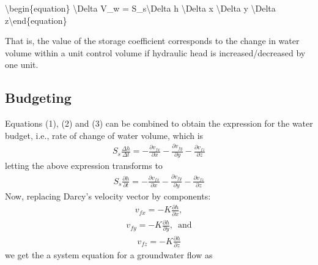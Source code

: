 \documentclass[letterpaper,10pt,english]{jupyterBook}
\begin{document}
\sphinxAtStartPar
\textbackslash{}begin\{equation\}
\textbackslash{}Delta V\_w = S\_s\textbackslash{}Delta h \textbackslash{}Delta x \textbackslash{}Delta y \textbackslash{}Delta z\textbackslash{}end\{equation\}

\sphinxAtStartPar
That is, the value of the storage coefficient corresponds to the change in water volume within a unit control volume if hydraulic head is increased/decreased by one unit.


\subsection{Budgeting}
\label{\detokenize{content/flow/L7/17_quantify_flow:budgeting}}
\sphinxAtStartPar
Equations (1), (2) and (3) can be combined to obtain the expression for the water budget, i.e., rate of change of water volume, which is
\begin{equation*}
\begin{split}
S_s\frac{\Delta h}{\Delta t} = -\frac{\partial v_{fx}}{\partial x} - \frac{\partial v_{fy}}{\partial y} - \frac{\partial v_{fz}}{\partial z} 
\end{split}
\end{equation*}
\sphinxAtStartPar
letting  the above expression transforms to
\begin{equation*}
\begin{split}
S_s\frac{\partial h}{\partial t} = -\frac{\partial v_{fx}}{\partial x} - \frac{\partial v_{fy}}{\partial y} - \frac{\partial v_{fz}}{\partial z} 
\end{split}
\end{equation*}
\sphinxAtStartPar
Now, replacing Darcy’s velocity vector by components:
\begin{equation*}
\begin{split}
v_{fx}= -K \frac{\partial h}{\partial x},
\end{split}
\end{equation*}\begin{equation*}
\begin{split}
v_{fy}= -K \frac{\partial h}{\partial y},\, \text{ and}
\end{split}
\end{equation*}\begin{equation*}
\begin{split}
v_{fz}= -K \frac{\partial h}{\partial z}
\end{split}
\end{equation*}
\sphinxAtStartPar
we get the a system equation for a groundwater flow as
\end{document}
